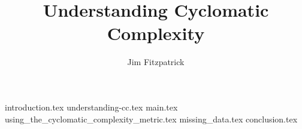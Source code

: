 \documentclass{article}
\title{Understanding Cyclomatic Complexity}
\author{Jim Fitzpatrick}
\begin{document}
\maketitle
{}
\newpage
\tableofcontents
\newpage
\listoffigures
{}
\newpage
{}


{introduction.tex}
{understanding-cc.tex}
{main.tex}
{using_the_cyclomatic_complexity_metric.tex}
{missing_data.tex}
{conclusion.tex}
\end{document}
